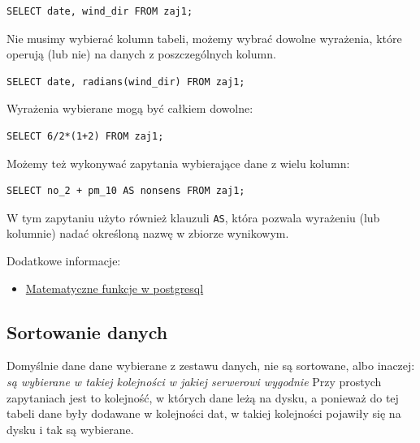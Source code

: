 \documentclass[a4paper]{article}
\begin{document}
\begin{verbatim}
SELECT date, wind_dir FROM zaj1;
\end{verbatim}


Nie musimy wybierać kolumn tabeli, możemy wybrać dowolne wyrażenia, które
operują (lub nie) na danych z poszczególnych kolumn.

\begin{verbatim}
SELECT date, radians(wind_dir) FROM zaj1;
\end{verbatim}


Wyrażenia wybierane mogą być całkiem dowolne:

\begin{verbatim}
SELECT 6/2*(1+2) FROM zaj1;
\end{verbatim}


Możemy też wykonywać zapytania wybierające dane z wielu kolumn:

\begin{verbatim}
SELECT no_2 + pm_10 AS nonsens FROM zaj1;
\end{verbatim}


W tym zapytaniu użyto również klauzuli \texttt{AS}, która pozwala
wyrażeniu (lub kolumnie) nadać określoną nazwę w zbiorze wynikowym.

Dodatkowe informacje:
%
\begin{itemize}

\item \href{https://www.google.pl/?q=postgresql\%209.2\%20mathematical\%20functions\#q=postgresql+9.2+mathematical+functions}{Matematyczne funkcje w postgresql}

\end{itemize}


\subsection{Sortowanie danych%
  \label{sortowanie-danych}%
}

Domyślnie dane dane wybierane z zestawu danych, nie są sortowane,
albo inaczej: \emph{są wybierane w takiej kolejności w jakiej serwerowi wygodnie}
Przy prostych zapytaniach jest to kolejność, w których dane leżą na dysku, a
ponieważ do tej tabeli dane były dodawane w kolejności dat, w takiej kolejności
pojawiły się na dysku i tak są wybierane.
\end{document}
